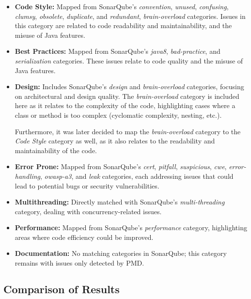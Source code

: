 \begin{itemize}
	\item \textbf{Code Style:} Mapped from SonarQube's \textit{convention}, \textit{unused}, \textit{confusing}, \textit{clumsy}, \textit{obsolete}, \textit{duplicate}, and \textit{redundant}, \textit{brain-overload} categories. Issues in this category are related to code readability and maintainability, and the misuse of Java features.

	\item \textbf{Best Practices:} Mapped from SonarQube's \textit{java8}, \textit{bad-practice}, and \textit{serialization} categories. These issues relate to code quality and the misuse of Java features.

	\item \textbf{Design:} Includes SonarQube's \textit{design} and \textit{brain-overload} categories, focusing on architectural and design quality. The \textit{brain-overload} category is included here as it relates to the complexity of the code, highlighting cases where a class or method is too complex (cyclomatic complexity, nesting, etc.).

	      Furthermore, it was later decided to map the \textit{brain-overload} category to the \textit{Code Style} category as well, as it also relates to the readability and maintainability of the code.

	\item \textbf{Error Prone:} Mapped from SonarQube's \textit{cert}, \textit{pitfall}, \textit{suspicious}, \textit{cwe}, \textit{error-handling}, \textit{owasp-a3}, and \textit{leak} categories, each addressing issues that could lead to potential bugs or security vulnerabilities.

	\item \textbf{Multithreading:} Directly matched with SonarQube's \textit{multi-threading} category, dealing with concurrency-related issues.

	\item \textbf{Performance:} Mapped from SonarQube's \textit{performance} category, highlighting areas where code efficiency could be improved.

	\item \textbf{Documentation:} No matching categories in SonarQube; this category remains with issues only detected by PMD.
\end{itemize}

\subsection{Comparison of Results}

